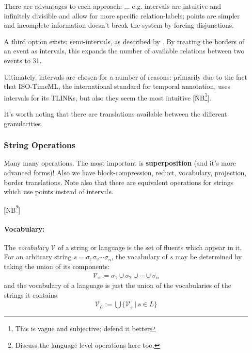 \documentclass[a4paper,12pt,leqno]{article}
\newcommand{\selfnote}[1]{{\color{red}[NB\footnote{{\color{red}#1}}]}}
\newcommand{\nb}{\selfnote}
\begin{document}
There are advantages to each approach: ... e.g. intervals are intuitive and infinitely divisible and allow for more specific relation-labels; points are simpler and incomplete information doesn't break the system by forcing disjunctions.

A third option exists: semi-intervals, as described by \cite{Freksa1992}. By treating the borders of an event as intervals, this expands the number of available relations between two events to 31.

Ultimately, intervals are chosen for a number of reasons: primarily due to the fact that ISO-TimeML, the international standard for temporal annotation, uses intervals for its TLINKs, but also they seem the most intuitive \nb{This is vague and subjective; defend it better}.

It's worth noting that there are translations available between the different granularities.

\subsubsection{String Operations}\label{ssub:operations}
Many many operations. The most important is \textbf{superposition} (and it's more advanced forms)! Also we have block-compression, reduct, vocabulary, projection, border translations. Note also that there are equivalent operations for strings which use points instead of intervals.

\nb{Discuss the language level operations here too.}

\paragraph{Vocabulary:}
The \textit{vocabulary} $\mathcal{V}$ of a string or language is the set of fluents which appear in it. For an arbitrary string $s = \sigma_1\sigma_2\cdots\sigma_n$, the vocabulary of $s$ may be determined by taking the union of its components:
\begin{align}
	\mathcal{V}_s := \sigma_1 \cup \sigma_2 \cup \cdots \cup \sigma_n
\end{align}
and the vocabulary of a language is just the union of the vocabularies of the strings it contains:
\begin{align}
	\mathcal{V}_L := \bigcup \{\mathcal{V}_s ~|~ s \in L \}
\end{align}
\end{document}

